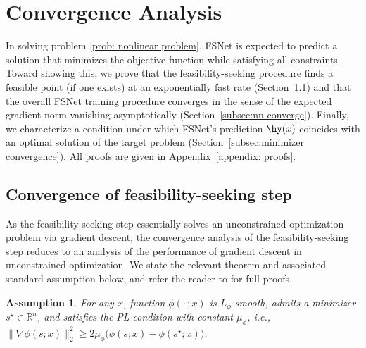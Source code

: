 \documentclass{article}
\def\R{\mathbb{R}}
\newtheorem{assumption}{Assumption}
\def\x{x}
\begin{document}
\section{Convergence Analysis} \label{sec: analysis}

In solving problem \eqref{prob: nonlinear problem}, FSNet is expected to predict a solution that minimizes the objective function while satisfying all constraints. 
Toward showing this, we prove that the feasibility-seeking procedure finds a feasible point (if one exists) at an exponentially fast rate (Section~\ref{subsec:fs-zero}) and that the overall FSNet training procedure converges in the sense of the expected gradient norm vanishing asymptotically (Section~\ref{subsec:nn-converge}). Finally, we characterize a condition under which FSNet's prediction $\hy(\x)$ coincides with an optimal solution of the target problem (Section~\ref{subsec:minimizer convergence}).
All proofs are given in Appendix~\ref{appendix: proofs}.

\subsection{Convergence of feasibility-seeking step}
\label{subsec:fs-zero}

As the feasibility-seeking step essentially solves an unconstrained optimization problem via gradient descent, the convergence analysis of the feasibility-seeking step reduces to an analysis of the performance of gradient descent in unconstrained optimization.
We state the relevant theorem and associated standard assumption below, and refer the reader to \cite{polyak1963gradient, karimi2016linear} for full proofs.

\begin{assumption}\label{assump:phi}
For any $x$, function $\phi(\cdot \,; \x)$ is $L_\phi$-smooth,
admits a minimizer $s^\star \in \R^n$,  and satisfies the PL condition with constant $\mu_\phi$, i.e., $\|\nabla\phi(s;\x)\|^2_2 \geq 2 \mu_\phi\bigl(\phi(s;\x)-\phi(s^\star; \x) \bigr)$.
\end{assumption}
\end{document}
